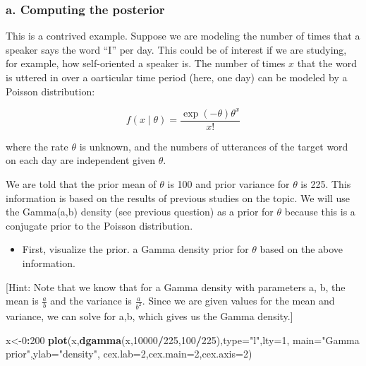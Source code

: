 \documentclass[12pt,]{krantz}
\newenvironment{Shaded}{\begin{snugshade}}{\end{snugshade}}
\newcommand{\DataTypeTok}[1]{\textcolor[rgb]{0.13,0.29,0.53}{#1}}
\newcommand{\DecValTok}[1]{\textcolor[rgb]{0.00,0.00,0.81}{#1}}
\newcommand{\KeywordTok}[1]{\textcolor[rgb]{0.13,0.29,0.53}{\textbf{#1}}}
\newcommand{\NormalTok}[1]{#1}
\newcommand{\OperatorTok}[1]{\textcolor[rgb]{0.81,0.36,0.00}{\textbf{#1}}}
\newcommand{\StringTok}[1]{\textcolor[rgb]{0.31,0.60,0.02}{#1}}
\providecommand{\tightlist}{%
  \setlength{\itemsep}{0pt}\setlength{\parskip}{0pt}}
\theoremstyle{definition}
\theoremstyle{definition}
\theoremstyle{definition}
\theoremstyle{remark}
\begin{document}
\hypertarget{a.-computing-the-posterior}{%
\subsubsection{a. Computing the posterior}\label{a.-computing-the-posterior}}

This is a contrived example. Suppose we are modeling the number of times that a speaker says the word ``I'' per day. This could be of interest if we are studying, for example, how self-oriented a speaker is. The number of times \(x\) that the word is uttered in over a oarticular time period (here, one day) can be modeled by a Poisson distribution:

\begin{equation}
f(x\mid \theta) = \frac{\exp(-\theta) \theta^x}{x!}
\end{equation}

where the rate \(\theta\) is unknown, and the numbers of utterances of the target word on each day are independent given \(\theta\).

We are told that the prior mean of \(\theta\) is 100 and prior variance for \(\theta\) is 225. This information is based on the results of previous studies on the topic. We will use the Gamma(a,b) density (see previous question) as a prior for \(\theta\) because this is a conjugate prior to the Poisson distribution.

\begin{itemize}
\tightlist
\item
  First, visualize the prior. a Gamma density prior for \(\theta\) based on the above information.
\end{itemize}

{[}Hint: Note that we know that for a Gamma density with parameters a, b, the mean is \(\frac{a}{b}\) and the variance is \(\frac{a}{b^2}\). Since we are given values for the mean and variance, we can solve for a,b, which gives us the Gamma density.{]}

\begin{Shaded}
\begin{Highlighting}[]
\NormalTok{x<-}\DecValTok{0}\OperatorTok{:}\DecValTok{200}
\KeywordTok{plot}\NormalTok{(x,}\KeywordTok{dgamma}\NormalTok{(x,}\DecValTok{10000}\OperatorTok{/}\DecValTok{225}\NormalTok{,}\DecValTok{100}\OperatorTok{/}\DecValTok{225}\NormalTok{),}\DataTypeTok{type=}\StringTok{"l"}\NormalTok{,}\DataTypeTok{lty=}\DecValTok{1}\NormalTok{,}
     \DataTypeTok{main=}\StringTok{"Gamma prior"}\NormalTok{,}\DataTypeTok{ylab=}\StringTok{"density"}\NormalTok{,}
     \DataTypeTok{cex.lab=}\DecValTok{2}\NormalTok{,}\DataTypeTok{cex.main=}\DecValTok{2}\NormalTok{,}\DataTypeTok{cex.axis=}\DecValTok{2}\NormalTok{)}
\end{Highlighting}
\end{Shaded}
\end{document}
